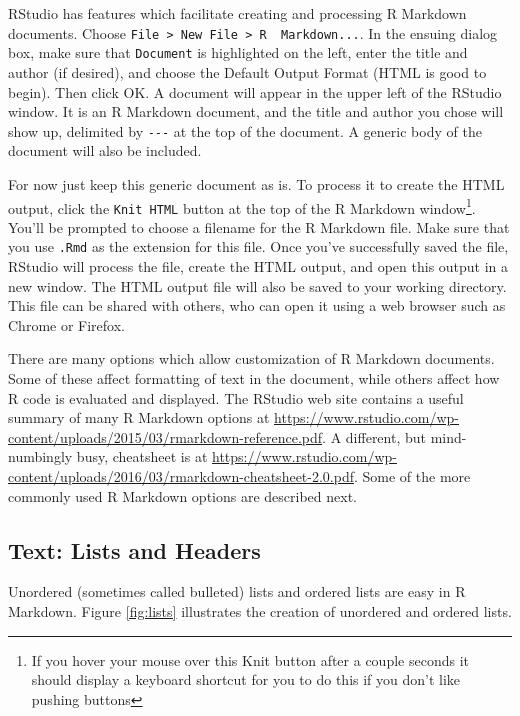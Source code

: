 \documentclass[
]{krantz}
\begin{document}
RStudio has features which facilitate creating and processing R Markdown documents. Choose \texttt{File\ \textgreater{}\ New\ File\ \textgreater{}\ R\ \ Markdown...}. In the ensuing dialog box, make sure that \texttt{Document} is highlighted on the left, enter the title and author (if desired), and choose the Default Output Format (HTML is good to begin). Then click OK. A document will appear in the upper left of the RStudio window. It is an R Markdown document, and the title and author you chose will show up, delimited by \texttt{-\/-\/-} at the top of the document. A generic body of the document will also be included.

For now just keep this generic document as is. To process it to create the HTML output, click the \texttt{Knit\ HTML} button at the top of the R Markdown window\footnote{If you hover your mouse over this Knit button after a couple seconds it should display a keyboard shortcut for you to do this if you don't like pushing buttons}. You'll be prompted to choose a filename for the R Markdown file. Make sure that you use \texttt{.Rmd} as the extension for this file. Once you've successfully saved the file, RStudio will process the file, create the HTML output, and open this output in a new window. The HTML output file will also be saved to your working directory. This file can be shared with others, who can open it using a web browser such as Chrome or Firefox.

There are many options which allow customization of R Markdown documents. Some of these affect formatting of text in the document, while others affect how R code is evaluated and displayed. The RStudio web site contains a useful summary of many R Markdown options at \url{https://www.rstudio.com/wp-content/uploads/2015/03/rmarkdown-reference.pdf}. A different, but mind-numbingly busy, cheatsheet is at \url{https://www.rstudio.com/wp-content/uploads/2016/03/rmarkdown-cheatsheet-2.0.pdf}. Some of the more commonly used R Markdown options are described next.

\hypertarget{text-lists-and-headers}{%
\subsection{Text: Lists and Headers}\label{text-lists-and-headers}}

Unordered (sometimes called bulleted) lists and ordered lists are easy in R Markdown. Figure \ref{fig:lists} illustrates the creation of unordered and ordered lists.
\end{document}
